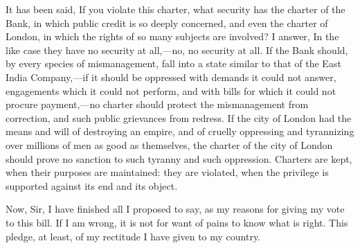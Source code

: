 It has been said, If you violate this charter, what security has the charter of the Bank, in which public credit is so deeply concerned, and even the charter of London, in which the rights of so many subjects are involved? I answer, In the like case they have no security at all,—no, no security at all. If the Bank should, by every species of mismanagement, fall into a state similar to that of the East India Company,—if it should be oppressed with demands it could not answer, engagements which it could not perform, and with bills for which it could not procure payment,—no charter should protect the mismanagement from correction, and such public grievances from redress. If the city of London had the means and will of destroying an empire, and of cruelly oppressing and tyrannizing over millions of men as good as themselves, the charter of the city of London should prove no sanction to such tyranny and such oppression. Charters are kept, when their purposes are maintained: they are violated, when the privilege is supported against its end and its object.

Now, Sir, I have finished all I proposed to say, as my reasons for giving my vote to this bill. If I am wrong, it is not for want of pains to know what is right. This pledge, at least, of my rectitude I have given to my country.


